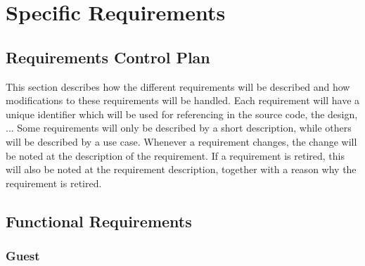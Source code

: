 \chapter{Specific Requirements}

\section{Requirements Control Plan}
	This section describes how the different requirements will be described and how 
	modifications to these requirements will be handled.
	Each requirement will have a unique identifier which will be used for referencing 
	in the source code, the design, ... Some requirements will only be described by
	a short description, while others will be described by a use case.
	Whenever a requirement changes, the change will be noted at the description of 
	the requirement. If a requirement is retired, this will also be noted at the
	requirement description, together with a reason why the requirement is retired.

\section{Functional Requirements} %
	\subsection{Guest}
